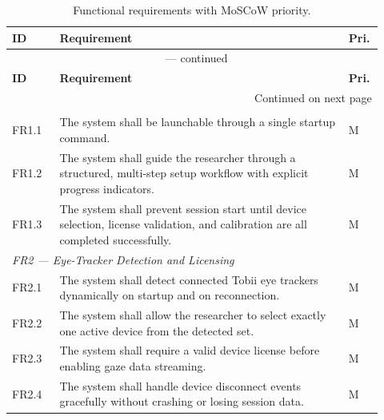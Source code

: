 \begingroup
\small
\begin{longtable}{%
  p{0.12\linewidth}
  p{0.73\linewidth}
  p{0.07\linewidth}
}
\caption{Functional requirements with MoSCoW priority.}
\label{tab:fr} \\
\toprule
\textbf{ID} & \textbf{Requirement} & \textbf{Pri.} \\
\midrule
\endfirsthead

\multicolumn{3}{c}{\tablename~\thetable{} — continued} \\
\toprule
\textbf{ID} & \textbf{Requirement} & \textbf{Pri.} \\
\midrule
\endhead

\midrule
\multicolumn{3}{r}{\footnotesize Continued on next page} \\
\endfoot

\bottomrule
\endlastfoot

\multicolumn{3}{l}{\textit{FR1 — System Execution and Setup}} \\
\midrule
FR1.1 & The system shall be launchable through a single startup command. & M \\
FR1.2 & The system shall guide the researcher through a structured, multi-step
        setup workflow with explicit progress indicators. & M \\
FR1.3 & The system shall prevent session start until device selection, license
        validation, and calibration are all completed successfully. & M \\
\midrule

\multicolumn{3}{l}{\textit{FR2 — Eye-Tracker Detection and Licensing}} \\
\midrule
FR2.1 & The system shall detect connected Tobii eye trackers dynamically on
        startup and on reconnection. & M \\
FR2.2 & The system shall allow the researcher to select exactly one active
        device from the detected set. & M \\
FR2.3 & The system shall require a valid device license before enabling gaze
        data streaming. & M \\
FR2.4 & The system shall handle device disconnect events gracefully without
        crashing or losing session data. & M \\
\midrule


\end{longtable}
